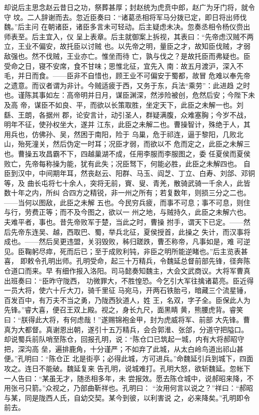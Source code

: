却说后主思念赵云昔日之功，祭葬甚厚；封赵统为虎贲中郎，赵广为牙门将，就令守
坟。二人辞谢而去。忽近臣奏曰：“诸葛丞相将军马分拨已定，即日将出师伐魏。”后主问
在朝诸臣，诸臣多言未可轻动。后主疑虑未决。忽奏丞相令杨仪赍出师表至。后主宜入，仪
呈上表章。后主就御案上拆视，其表曰：“先帝虑汉贼不两立，王业不偏安，故托臣以讨贼
也。以先帝之明，量臣之才，故知臣伐贼，才弱敌强也。然不伐贼，王业亦亡。惟坐而待
亡，孰与伐之？是故托臣而弗疑也。臣受命之日，寝不安席，食不甘味；思惟北征，宜先入
南：故五月渡沪，深入不毛，并日而食。——臣非不自惜也，顾王业不可偏安于蜀都，故冒
危难以奉先帝之遗意。而议者谓为非计。今贼适疲于西，又务于东，兵法“乘劳”：此进趋
之时也。谨陈其事如左：高帝明并日月，谋臣渊深，然涉险被创，危然后安；今陛下未及高
帝，谋臣不如良、平，而欲以长策取胜，坐定天下，此臣之未解一也。刘繇、王朗，各据州
郡，论安言计，动引圣人，群疑满腹，众难塞胸；今岁不战，明年不征，使孙权坐大，遂并
江东，此臣之未解二也。曹操智计，殊绝于人，其用兵也，仿佛孙、吴，然困于南阳，险于
乌巢，危于祁连，逼于黎阳，几败北山，殆死潼关，然后伪定一时耳；况臣才弱，而欲以不
危而定之，此臣之未解三也。曹操五攻昌霸不下，四越巢湖不成，任用李服而李服图之，委
任夏侯而夏侯败亡，先帝每称操为能，犹有此失；况臣驽下，何能必胜，此臣之未解四也。
自臣到汉中，中间期年耳，然丧赵云、阳群、马玉、阎芝、丁立、白寿、刘郃、邓铜等，及
曲长屯将七十余人，突将无前，賨、叟、青羌，散骑武骑一千余人，此皆数十年之内，所纠
合四方之精锐，非一州之所有；若复数年，则损三分之二也。——当何以图敌，此臣之未解
五也。今民穷兵疲，而事不可息；事不可息，则住与行，劳费正等；而不及今图之，欲以一
州之地，与贼持久，此臣之未解六也。夫难平者，事也。昔先帝败军于楚，当此之时，曹操
拊手，谓天下已定。——然后先帝东连吴、越，西取巴、蜀，举兵北征，夏侯授首，此操之
失计，而汉事将成也。——然后吴更违盟，关羽毁败，秭归蹉跌，曹丕称帝，凡事如是，难
可逆见。臣鞠躬尽瘁，死而后已；至于成败利钝，非臣之明所能逆睹也。”后主览表甚喜，
即敕令孔明出师。孔明受命，起三十万精兵，令魏延总督前部先锋，径奔陈仓道口而来。早
有细作报入洛阳。司马懿奏知魏主，大会文武商议。大将军曹真出班奏曰：“臣昨守陇西，
功微罪大，不胜惶恐。今乞引大军往擒诸葛亮。臣近得一员大将，使六十斤大刀，骑千里征
马宛马，开两石铁胎弓，暗藏三个流星锤，百发百中，有万夫不当之勇，乃陇西狄道人，姓
王，名双，字子全。臣保此人为先锋。”睿大喜，便召王双上殿。视之，身长九尺，面黑睛
黄，熊腰虎背。睿笑曰：“朕得此大将，有何虑哉！”遂赐锦袍金甲，封为虎威将军、前部
大先锋。曹真为大都督。真谢恩出朝，遂引十五万精兵，会合郭淮、张郃，分道守把隘口。
却说蜀兵前队哨至陈仓，回报孔明，说：“陈仓口已筑起一城，内有大将郝昭守把，深沟高
垒，遍排鹿角，十分谨严；不如弃了此城，从太白岭鸟道出祁山甚便。”孔明曰：“陈仓正
北是街亭；必得此城，方可进兵。”命魏延引兵到城下，四面攻之。连日不能破。魏延复来
告孔明，说城难打。孔明大怒，欲斩魏延。忽帐下一人告曰：“某虽无才，随丞相多年，未
尝报效。愿去陈仓城中，说郝昭来降，不用张弓只箭。”众视之，乃部曲靳祥也。孔明曰：
“汝用何言以说之？”祥曰：“郝昭与某，同是陇西人氏，自幼交契。某今到彼，以利害说
之，必来降矣。”孔明即令前去。

